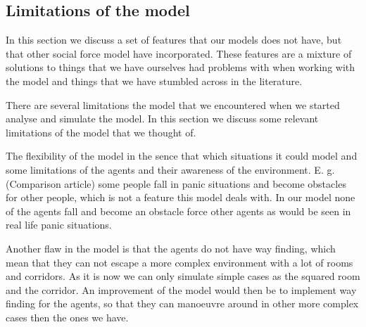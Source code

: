 % 

\subsection{Limitations of the model}
In this section we discuss a set of features that our models does not have, but
that other social force model have incorporated. These features are a mixture of 
solutions to things that we have ourselves had problems with when working with the 
model and things that we have stumbled across in the literature.

There are several limitations the model that we encountered when we started 
analyse and simulate the model. In this section we discuss some relevant 
limitations of the model that we thought of.

The flexibility of the model in the sence that which situations it could model 
and some limitations of the agents and their awareness of the environment.
E. g. (Comparison article) some people fall in panic situations and become 
obstacles for other people, which is not a feature this model deals with. In 
our model none of the agents fall and become an obstacle force other agents as 
would be seen in real life panic situations.

Another flaw in the model is that the agents do not have way finding, which 
mean that they can not escape a more complex environment with a lot of rooms 
and corridors. As it is now we can only simulate simple cases as the squared 
room and the corridor.  An improvement of the model would then be to implement 
way finding for the agents, so that they can manoeuvre around in other more 
complex cases then the ones we have.

